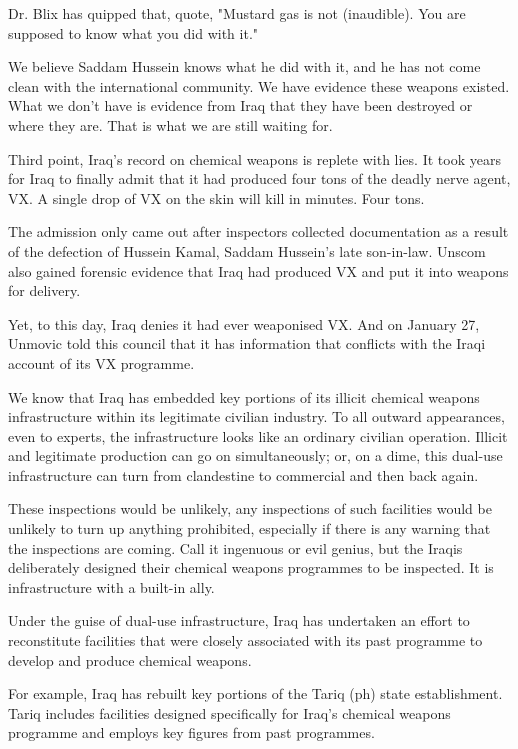 \documentclass[10pt,a4paper]{article}
\begin{document}
Dr. Blix has quipped that, quote, "Mustard gas is not (inaudible). You are supposed to know what you did with it."

We believe Saddam Hussein knows what he did with it, and he has not come clean with the international community. We have evidence these weapons existed. What we don't have is evidence from Iraq that they have been destroyed or where they are. That is what we are still waiting for.

Third point, Iraq's record on chemical weapons is replete with lies. It took years for Iraq to finally admit that it had produced four tons of the deadly nerve agent, VX. A single drop of VX on the skin will kill in minutes. Four tons.

The admission only came out after inspectors collected documentation as a result of the defection of Hussein Kamal, Saddam Hussein's late son-in-law. Unscom also gained forensic evidence that Iraq had produced VX and put it into weapons for delivery.

Yet, to this day, Iraq denies it had ever weaponised VX. And on January 27, Unmovic told this council that it has information that conflicts with the Iraqi account of its VX programme.

We know that Iraq has embedded key portions of its illicit chemical weapons infrastructure within its legitimate civilian industry. To all outward appearances, even to experts, the infrastructure looks like an ordinary civilian operation. Illicit and legitimate production can go on simultaneously; or, on a dime, this dual-use infrastructure can turn from clandestine to commercial and then back again.

These inspections would be unlikely, any inspections of such facilities would be unlikely to turn up anything prohibited, especially if there is any warning that the inspections are coming. Call it ingenuous or evil genius, but the Iraqis deliberately designed their chemical weapons programmes to be inspected. It is infrastructure with a built-in ally.

Under the guise of dual-use infrastructure, Iraq has undertaken an effort to reconstitute facilities that were closely associated with its past programme to develop and produce chemical weapons.

For example, Iraq has rebuilt key portions of the Tariq (ph) state establishment. Tariq includes facilities designed specifically for Iraq's chemical weapons programme and employs key figures from past programmes.
\end{document}
